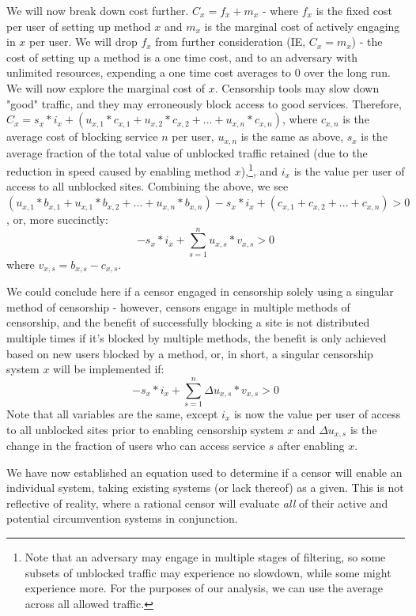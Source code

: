 \documentclass[12pt]{report}
\begin{document}
We will now break down cost further. $C_x = f_x + m_x$ - where $f_x$ is the fixed cost per user of setting up method $x$ and $m_x$ is the marginal cost of actively engaging in $x$ per user. We will drop $f_x$ from further consideration (IE, $C_x = m_x$) - the cost of setting up a method is a one time cost, and to an adversary with unlimited resources, expending a one time cost averages to $0$ over the long run. We will now explore the marginal cost of $x$. Censorship tools may slow down "good" traffic, and they may erroneously block access to good services. Therefore, $C_x = s_x*i_x + (u_{x,1}*c_{x,1} + u_{x,2}*c_{x,2} + ...  + u_{x,n}*c_{x,n})$, where $c_{x,n}$ is the average cost of blocking service $n$ per user, $u_{x,n}$ is the same as above, $s_x$ is the average fraction of the total value of unblocked traffic retained (due to the reduction in speed caused by enabling method $x$),\footnote{Note that an adversary may engage in multiple stages of filtering, so some subsets of unblocked traffic may experience no slowdown, while some might experience more. For the purposes of our analysis, we can use the average across all allowed traffic.}, and $i_x$ is the value per user of access to all unblocked sites. Combining the above, we see
$(u_{x,1}*b_{x,1} + u_{x,1}*b_{x,2} + ... + u_{x,n}*b_{x,n}) - s_x*i_x + (c_{x,1} + c_{x,2} + ...  + c_{x,n}) > 0$, or, more succinctly:
\begin{equation}
-s_x*i_x + \sum_{s=1}^{n}u_{x,s}*v_{x,s} > 0
\end{equation}
where $v_{x,s} = b_{x,s} - c_{x,s}$.

We could conclude here if a censor engaged in censorship solely using a singular method of censorship - however, censors engage in multiple methods of censorship, and the benefit of successfully blocking a site is not distributed multiple times if it's blocked by multiple methods, the benefit is only achieved based on new users blocked by a method, or, in short, a singular censorship system $x$ will be implemented if:
\begin{equation}
-s_x*i_x + \sum_{s=1}^{n}\Delta u_{x,s}*v_{x,s} > 0
\end{equation}
Note that all variables are the same, except $i_x$ is now the value per user of access to all unblocked sites prior to enabling censorship system $x$ and $\Delta u_{x,s}$ is the change in the fraction of users who can access service $s$ after enabling $x$.

We have now established an equation used to determine if a censor will enable an individual system, taking existing systems (or lack thereof) as a given. This is not reflective of reality, where a rational censor will evaluate \emph{all} of their active and potential circumvention systems in conjunction.
\end{document}
